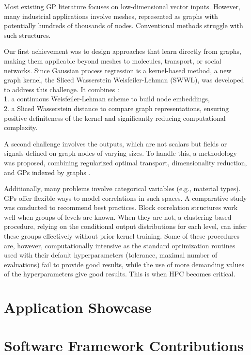 Most existing GP literature focuses on low-dimensional vector inputs. However, many industrial applications involve meshes, represented as graphs with potentially hundreds of thousands of nodes. Conventional methods struggle with such structures.

Our first achievement was to design approaches that learn directly from graphs, making them applicable beyond meshes to molecules, transport, or social networks.
Since Gaussian process regression is a kernel-based method,
a new graph kernel, the Sliced Wasserstein Weisfeiler-Lehman (SWWL), was developed to address this challenge. It combines \cite{carpintero2024}:\\
	1.	a continuous Weisfeiler-Lehman scheme to build node embeddings,\\
	2.	a Sliced Wasserstein distance to compare graph representations, ensuring positive definiteness of the kernel and significantly reducing computational complexity.

A second challenge involves the outputs, which are not scalars but fields or signals defined on graph nodes of varying sizes. To handle this, a methodology was proposed, combining regularized optimal transport, dimensionality reduction, and GPs indexed by graphs \cite{carpintero2025}.

Additionally, many problems involve categorical variables (e.g., material types). GPs offer flexible ways to model correlations in such spaces. A comparative study was conducted to recommend best practices. Block correlation structures work well when groups of levels are known. When they are not, a clustering-based procedure, relying on the conditional output distributions for each level, can infer these groups effectively without prior kernel training.
Some of these procedures are, however, computationally intensive as the standard optimization routines used with their default hyperparameters (tolerance, maximal number of evaluations) fail to provide good results, while the use of more demanding values of the hyperparameters give good results. This is when HPC becomes critical.

\section{Application Showcase}
%   

\section{Software Framework Contributions}

